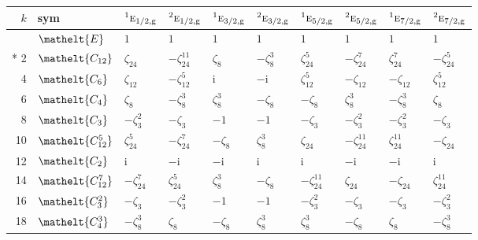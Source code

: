 \documentclass[10pt,a4paper]{article}
\numberwithin{equation}{section}
\newcommand{\eltfont}[1]{{\let\sigma\eltsigma\mathelt{#1}}}
\newcommand{\irr}[1]{\text{\normalfont\scshape #1}}
\newcommand{\conjpair}[1]{{}^{#1}}
\newcommand{\cls}[1]{\eltfont{#1}}
\newcommand{\ptag}[1]{\mathrm{#1}}
\newcommand{\iunit}{\mathrm{i}}
\newcommand{\rootunity}[1]{\zeta_{#1}}
\begin{document}
{\small\setlength{\tabcolsep}{4pt}
\begin{longtable}{@{}rlllllllll@{}}\toprule
$k$ & sym & $\conjpair{1}\irr{e}_{1/2,\ptag{g}}$ & $\conjpair{2}\irr{e}_{1/2,\ptag{g}}$ & $\conjpair{1}\irr{e}_{3/2,\ptag{g}}$ & $\conjpair{2}\irr{e}_{3/2,\ptag{g}}$ & $\conjpair{1}\irr{e}_{5/2,\ptag{g}}$ & $\conjpair{2}\irr{e}_{5/2,\ptag{g}}$ & $\conjpair{1}\irr{e}_{7/2,\ptag{g}}$ & $\conjpair{2}\irr{e}_{7/2,\ptag{g}}$\\\midrule\endhead
\bottomrule\endfoot\endlastfoot
0 & $\cls{E}$ & $1$ & $1$ & $1$ & $1$ & $1$ & $1$ & $1$ & $1$\\*
2 & $\cls{C_{12}}$ & $\rootunity{24}$ & $-\rootunity{24}^{11}$ & $\rootunity{8}$ & $-\rootunity{8}^{3}$ & $\rootunity{24}^{5}$ & $-\rootunity{24}^{7}$ & $\rootunity{24}^{7}$ & $-\rootunity{24}^{5}$\\
4 & $\cls{C_{6}}$ & $\rootunity{12}$ & $-\rootunity{12}^{5}$ & $\iunit{}$ & $-\iunit{}$ & $\rootunity{12}^{5}$ & $-\rootunity{12}$ & $-\rootunity{12}$ & $\rootunity{12}^{5}$\\
6 & $\cls{C_{4}}$ & $\rootunity{8}$ & $-\rootunity{8}^{3}$ & $\rootunity{8}^{3}$ & $-\rootunity{8}$ & $-\rootunity{8}$ & $\rootunity{8}^{3}$ & $-\rootunity{8}^{3}$ & $\rootunity{8}$\\
8 & $\cls{C_{3}}$ & $-\rootunity{3}^{2}$ & $-\rootunity{3}$ & $-1$ & $-1$ & $-\rootunity{3}$ & $-\rootunity{3}^{2}$ & $-\rootunity{3}^{2}$ & $-\rootunity{3}$\\
10 & $\cls{C_{12}^{5}}$ & $\rootunity{24}^{5}$ & $-\rootunity{24}^{7}$ & $-\rootunity{8}$ & $\rootunity{8}^{3}$ & $\rootunity{24}$ & $-\rootunity{24}^{11}$ & $\rootunity{24}^{11}$ & $-\rootunity{24}$\\
12 & $\cls{C_{2}}$ & $\iunit{}$ & $-\iunit{}$ & $-\iunit{}$ & $\iunit{}$ & $\iunit{}$ & $-\iunit{}$ & $-\iunit{}$ & $\iunit{}$\\
14 & $\cls{C_{12}^{7}}$ & $-\rootunity{24}^{7}$ & $\rootunity{24}^{5}$ & $\rootunity{8}^{3}$ & $-\rootunity{8}$ & $-\rootunity{24}^{11}$ & $\rootunity{24}$ & $-\rootunity{24}$ & $\rootunity{24}^{11}$\\
16 & $\cls{C_{3}^{2}}$ & $-\rootunity{3}$ & $-\rootunity{3}^{2}$ & $-1$ & $-1$ & $-\rootunity{3}^{2}$ & $-\rootunity{3}$ & $-\rootunity{3}$ & $-\rootunity{3}^{2}$\\
18 & $\cls{C_{4}^{3}}$ & $-\rootunity{8}^{3}$ & $\rootunity{8}$ & $-\rootunity{8}$ & $\rootunity{8}^{3}$ & $\rootunity{8}^{3}$ & $-\rootunity{8}$ & $\rootunity{8}$ & $-\rootunity{8}^{3}$\\

\end{longtable}}
\end{document}

